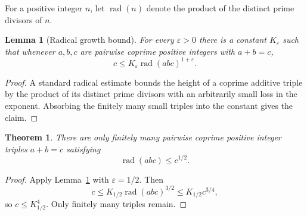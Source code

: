 \documentclass{article}
\newtheorem{theorem}{Theorem}
\newtheorem{lemma}{Lemma}
\newcommand{\rad}{\operatorname{rad}}
\begin{document}
For a positive integer $n$, let $\rad(n)$ denote the product of the
distinct prime divisors of $n$.

\begin{lemma}[Radical growth bound]\label{lem:abc-radical}
For every $\varepsilon>0$ there is a constant $K_\varepsilon$ such that
whenever $a,b,c$ are pairwise coprime positive integers with $a+b=c$,
\[
  c\le K_\varepsilon\rad(abc)^{1+\varepsilon}.
\]
\end{lemma}
\begin{proof}
A standard radical estimate bounds the height of a coprime additive triple
by the product of its distinct prime divisors with an arbitrarily small
loss in the exponent. Absorbing the finitely many small triples into the
constant gives the claim.
\end{proof}

\begin{theorem}\label{thm:abc-finiteness}
There are only finitely many pairwise coprime positive integer triples
$a+b=c$ satisfying
\[
  \rad(abc)\le c^{1/2}.
\]
\end{theorem}
\begin{proof}
Apply Lemma~\ref{lem:abc-radical} with $\varepsilon=1/2$. Then
\[
 c\le K_{1/2}\rad(abc)^{3/2}\le K_{1/2}c^{3/4},
\]
so $c\le K_{1/2}^4$. Only finitely many triples remain.
\end{proof}
\end{document}
